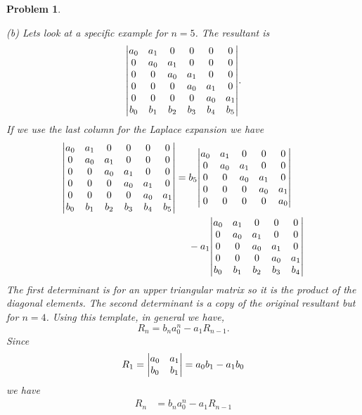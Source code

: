 \documentclass{article}
\theoremstyle{pprop}
\newtheorem{problem}{Problem}[section]
\begin{document}
\begin{problem}
\[\]
\par\noindent(b)
Lets look at a specific example for $n=5$. The resultant is  
\[
\mqty|
  a_0 & a_1 & 0   & 0   & 0    & 0  \\ 
  0   & a_0 & a_1 & 0   & 0    & 0  \\ 
  0   & 0   & a_0 & a_1 & 0    & 0  \\ 
  0   & 0   & 0   & a_0 & a_1  & 0  \\ 
  0   & 0   & 0   & 0   & a_0  & a_1  \\ 
  b_0 & b_1 & b_2 & b_3 & b_4  & b_5  \\ 
|.
\]
If we use the last column for the Laplace expansion we have 
\begin{align*}
  \mqty|
  a_0 & a_1 & 0   & 0   & 0    & 0  \\ 
  0   & a_0 & a_1 & 0   & 0    & 0  \\ 
  0   & 0   & a_0 & a_1 & 0    & 0  \\ 
  0   & 0   & 0   & a_0 & a_1  & 0  \\ 
  0   & 0   & 0   & 0   & a_0  & a_1  \\ 
  b_0 & b_1 & b_2 & b_3 & b_4  & b_5  \\ 
| & =
  b_5
  \mqty|
  a_0 & a_1 & 0   & 0   & 0    \\ 
  0   & a_0 & a_1 & 0   & 0    \\ 
  0   & 0   & a_0 & a_1 & 0    \\ 
  0   & 0   & 0   & a_0 & a_1  \\ 
  0   & 0   & 0   & 0   & a_0    \\ 
| \\
& \kern3ex - a_1
  \mqty|
  a_0 & a_1 & 0   & 0   & 0    \\ 
  0   & a_0 & a_1 & 0   & 0    \\ 
  0   & 0   & a_0 & a_1 & 0    \\ 
  0   & 0   & 0   & a_0 & a_1  \\ 
  b_0 & b_1 & b_2 & b_3 & b_4    \\ 
|
\end{align*}
The first determinant is for an upper triangular matrix so it is the product of the diagonal elements. The second determinant 
is a copy of the original resultant but for $n=4$. Using this template, in general we have, 
\[
R_n = b_n a_0^n - a_1 R_{n-1}.
\]
Since 
\[
R_1 =\mqty|a_0 & a_1 \\ b_0 & b_1|= a_0b_1 - a_1 b_0
\]
we have 
\begin{align*}
  R_n & = b_n a_0^n - a_1 R_{n-1} \\

\end{align*}
\end{problem}
\end{document}
